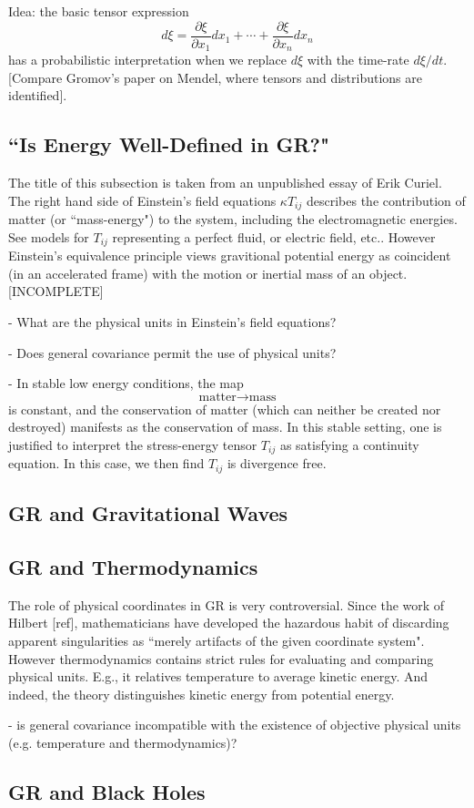 \documentclass[12pt]{amsart}
\theoremstyle{definition}
\theoremstyle{remark}
\begin{document}
Idea: the basic tensor expression $$d\xi=\frac{\partial \xi}{\partial x_1} dx_1+\cdots + \frac{\partial \xi}{\partial x_n} dx_n$$ has a probabilistic interpretation when we replace $d\xi$ with the time-rate $d\xi/dt$. [Compare Gromov's paper on Mendel, where tensors and distributions are identified].

\subsection{``Is Energy Well-Defined in GR?"}
The title of this subsection is taken from an unpublished essay of Erik Curiel. The right hand side of Einstein's field equations $\kappa T_{ij}$ describes the contribution of matter (or ``mass-energy") to the system, including the electromagnetic energies. See models for $T_{ij}$ representing a perfect fluid, or electric field, etc.. However Einstein's equivalence principle views gravitional potential energy as coincident (in an accelerated frame) with the motion or inertial mass of an object. [INCOMPLETE]

- What are the physical units in Einstein's field equations?

- Does general covariance permit the use of physical units?

- In stable low energy conditions, the map $$\text{matter} \to \text{mass}$$ is constant, and the conservation of matter (which can neither be created nor destroyed) manifests as the conservation of mass. In this stable setting, one is justified to interpret the stress-energy tensor $T_{ij}$ as satisfying a continuity equation. In this case, we then find $T_{ij}$ is divergence free.

\subsection{GR and Gravitational Waves}

\subsection{GR and Thermodynamics}

The role of physical coordinates in GR is very controversial. Since the work of Hilbert [ref], mathematicians have developed the hazardous habit of discarding apparent singularities as ``merely artifacts of the given coordinate system". However thermodynamics contains strict rules for evaluating and comparing physical units. E.g., it relatives temperature to average kinetic energy. And indeed, the theory distinguishes kinetic energy from potential energy.

- is general covariance incompatible with the existence of objective physical units (e.g. temperature and thermodynamics)?


\subsection{GR and Black Holes}






\printbibliography[title={References}]
\end{document}
